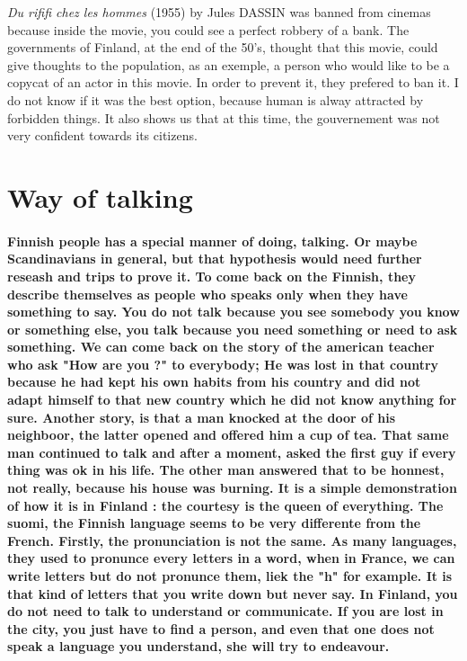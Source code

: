 \documentclass[a4paper,12pt]{report} %
\begin{document}
{\textit{Du rififi chez les hommes} (1955) by Jules DASSIN was banned from cinemas because inside the movie, you could see a perfect robbery of a bank. The governments of Finland, at the end of the 50's, thought that this movie, could give thoughts to the population, as an exemple, a person who would like to be a copycat of an actor in this movie. In order to prevent it, they prefered to ban it. I do not know if it was the best option, because human is alway attracted by forbidden things. It also shows us that at this time, the gouvernement was not very confident towards its citizens.}

\section{Way of talking}
\paragraph{Finnish people has a special manner of doing, talking. Or maybe Scandinavians in general, but that hypothesis would need further reseash and trips to prove it. To come back on the Finnish, they describe themselves as people who speaks only when they have something to say. You do not talk because you see somebody you know or something else, you talk because you need something or need to ask something. \newline
We can come back on the story of the american teacher who ask "How are you ?" to everybody; He was lost in that country because he had kept his own habits from his country and did not adapt himself to that new country which he did not know anything for sure. Another story, is that a man knocked at the door of his neighboor, the latter opened and offered him a cup of tea. That same man continued to talk and after a moment, asked the first guy if every thing was ok in his life. The other man answered that to be honnest, not really, because his house was burning. It is a simple demonstration of how it is in Finland : the courtesy is the queen of everything. \newline
The suomi, the Finnish language seems to be very differente from the French. Firstly, the pronunciation is not the same. As many languages, they used to pronunce every letters in a word, when in France, we can write letters but do not pronunce them, liek the "h" for example. It is that kind of letters that you write down but never say. \newline
In Finland, you do not need to talk to understand or communicate. If you are lost in the city, you just have to find a person, and even that one does not speak a language you understand, she will try to endeavour. \newline
}
\end{document}

